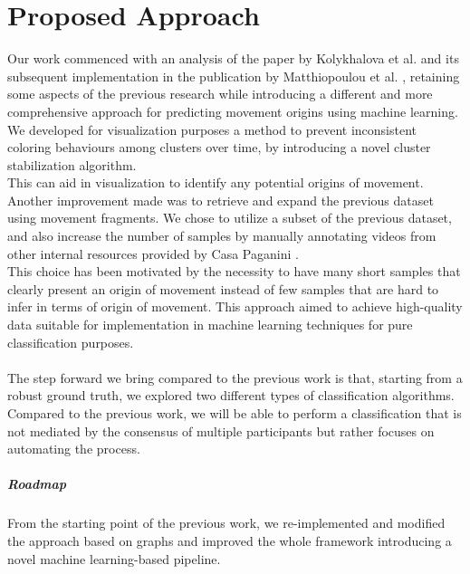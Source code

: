\chapter{Proposed Approach}
\label{chapter:proposed_approach}
Our work commenced with an analysis of the paper by Kolykhalova et al. \cite{kolykhalova:2020} and its subsequent implementation in the publication by Matthiopoulou et al. \cite{inproceedings_matteopropoli}, 
retaining some aspects of the previous research while introducing a different and more comprehensive approach for predicting movement origins using machine learning.\\

We developed for visualization purposes a method to prevent inconsistent coloring behaviours among clusters over time, by introducing a novel cluster stabilization algorithm.\\
This can aid in visualization to identify any potential origins of movement.\\

Another improvement made was to retrieve and expand the previous dataset using movement fragments. 
We chose to utilize a subset of the previous dataset, and also increase the number of samples by manually annotating videos from other internal resources provided by Casa Paganini \cite{casaPaganini}.\\ 
This choice has been motivated by the necessity to have many short samples that clearly present an origin of movement instead of few samples that are hard to infer in terms of origin of movement. 
This approach aimed to achieve high-quality data suitable for implementation in machine learning techniques for pure classification purposes.\\
\\
The step forward we bring compared to the previous work is that, starting from a robust ground truth, we explored two different types of classification algorithms.
Compared to the previous work, we will be able to perform a classification that is not mediated by the consensus of multiple participants but rather focuses on automating the process.

\paragraph{Roadmap}
From the starting point of the previous work, we re-implemented and modified the approach based on graphs and improved the whole framework introducing a novel machine learning-based pipeline.

